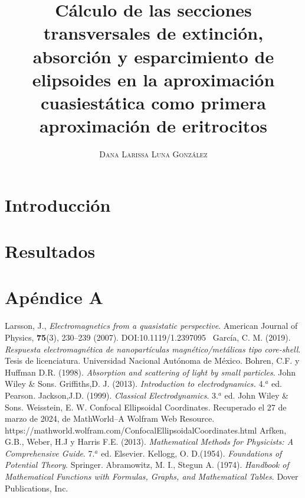 \documentclass[paper=letter,8.5pt]{article}
\title{\vspace{-15mm}\fontsize{17pt}\selectfont\textbf{Cálculo de las secciones transversales de extinción, absorción y esparcimiento de elipsoides en la aproximación cuasiestática como primera aproximación de eritrocitos }} %
\author{
\large
{\textsc{ Dana Larissa Luna González}}\\[2mm]}
\date{}
\begin{document}
\maketitle %
\thispagestyle{fancy} %
\section{Introducción}




\section{Resultados}

\section{Apéndice A}

















\begin{thebibliography}{99}
 Larsson, J., \textit{Electromagnetics from a quasistatic perspective}. American Journal of Physics, \textbf{75}(3), 230–239 (2007). DOI:10.1119/1.2397095 
 García, C. M. (2019). \textit{Respuesta electromagnética de nanopartículas magnético/metálicas tipo core-shell}. Tesis de licenciatura. Universidad Nacional Autónoma de México.
Bohren, C.F. y  Huffman D.R.  (1998). \textit{Absorption and scattering of light by small particles}. John Wiley \& Sons.
Griffiths,D. J.  (2013). \textit{Introduction to electrodynamics.} 4.$^a$ ed. Pearson.
Jackson,J.D.  (1999). \textit{Classical Electrodynamics}. 3.$^a$ ed.  John Wiley \& Sons.
 Weisstein, E. W. Confocal Ellipsoidal Coordinates. Recuperado el 27 de marzo de 2024, de MathWorld--A Wolfram Web Resource. https://mathworld.wolfram.com/ConfocalEllipsoidalCoordinates.html
 Arfken, G.B., Weber, H.J y Harris F.E. (2013). \textit{Mathematical Methods for Physicists: A Comprehensive Guide}. 7.$^a$ ed. Elsevier.
 Kellogg, O. D.(1954). \textit{Foundations of Potential Theory}. Springer.
 Abramowitz, M. I., Stegun A. (1974). \textit{Handbook of Mathematical Functions with Formulas, Graphs, and
Mathematical Tables}. Dover Publications, Inc.
\end{thebibliography}

\end{document}
